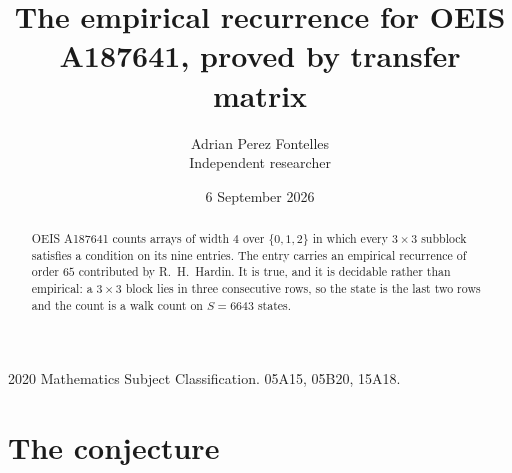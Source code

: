 \documentclass[11pt,a4paper]{article}
\title{The empirical recurrence for OEIS A187641, proved by transfer matrix}
\author{Adrian Perez Fontelles\\ \small Independent researcher}
\date{6 September 2026}
\theoremstyle{plain}
\theoremstyle{definition}
\begin{document}
\maketitle

\begin{abstract}
OEIS A187641 counts arrays of width $4$ over $\{0,1,2\}$ in which every $3\times3$ subblock
satisfies a condition on its nine entries. The entry carries an empirical recurrence of order
$65$ contributed by R.~H.~Hardin. It is true, and it is decidable rather than empirical: a
$3\times3$ block lies in three consecutive rows, so the state is the last two rows and the
count is a walk count on $S=6643$ states.
\end{abstract}

\noindent\small 2020 Mathematics Subject Classification. 05A15, 05B20, 15A18.\normalsize

\section{The conjecture}
\end{document}
